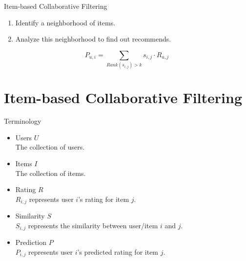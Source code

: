 \documentclass{beamer}
\begin{document}
\begin{frame}[fragile]{Item-based Collaborative Filtering}

\begin{enumerate}
\item Identify a neighborhood of items.
\item Analyze this neighborhood to find out recommends.
\end{enumerate}

\begin{equation}
P_{u,i} = \sum_{Rank(s_{i,j})>k}s_{i,j} \cdot R_{u,j}
\end{equation}

\end{frame}

\section{Item-based Collaborative Filtering}

\begin{frame}{Terminology}

\begin{itemize}
\item Users $U$\\
        The collection of users.
\item Items $I$\\
        The collection of items.
\item Rating $R$\\
        $R_{i,j}$ represents user $i$'s rating for item $j$.
\item Similarity $S$\\
        $S_{i,j}$ represents the similarity between user/item $i$ and $j$.
\item Prediction $P$ \\
        $P_{i,j}$ represents user $i$'s predicted rating for item $j$.
\end{itemize}

\end{frame}
\end{document}
